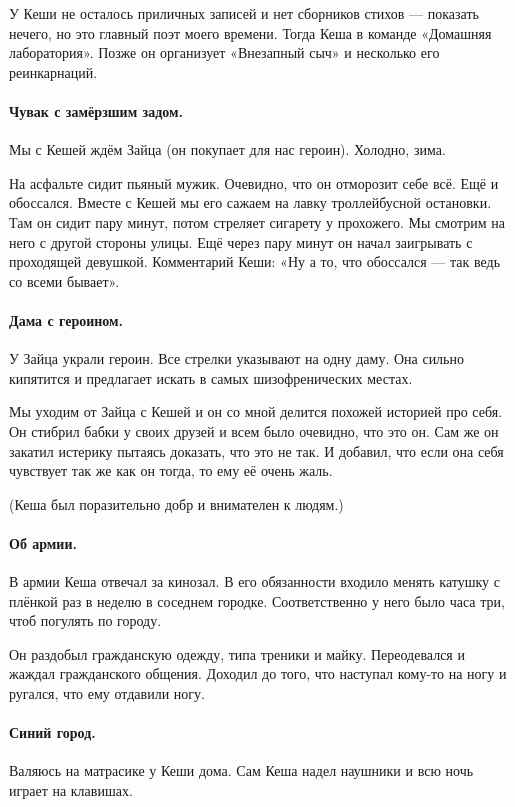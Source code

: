 \documentclass{book}
\begin{document}
У Кеши не осталось приличных записей и нет сборников стихов --- показать нечего, но это главный поэт моего времени.
Тогда Кеша в команде «Домашняя лаборатория».
Позже он организует «Внезапный сыч» и несколько его реинкарнаций.

\paragraph{Чувак с замёрзшим задом.}
Мы с Кешей ждём Зайца (он покупает для нас героин).
Холодно, зима.

На асфальте сидит пьяный мужик.
Очевидно, что он отморозит себе всё.
Ещё и обоссался.
Вместе с Кешей мы его сажаем на лавку троллейбусной остановки.
Там он сидит пару минут, потом стреляет сигарету у прохожего.
Мы смотрим на него с другой стороны улицы.
Ещё через пару минут он начал заигрывать с проходящей девушкой.
Комментарий Кеши: «Ну а то, что обоссался --- так ведь со всеми бывает».

\paragraph{Дама с героином.}
У Зайца украли героин.
Все стрелки указывают на одну даму.
Она сильно кипятится и предлагает искать в самых шизофренических местах.

Мы уходим от Зайца с Кешей и он со мной делится похожей историей про себя.
Он стибрил бабки у своих друзей и всем было очевидно, что это он.
Сам же он закатил истерику пытаясь доказать, что это не так.
И добавил, что если она себя чувствует так же как он тогда, то ему её очень жаль.

(Кеша был поразительно добр и внимателен к людям.)

\paragraph{Об армии.}
В армии Кеша отвечал за кинозал. 
В его обязанности входило менять катушку с плёнкой раз в неделю в соседнем городке.
Соответственно у него было часа три, чтоб погулять по городу.

Он раздобыл гражданскую одежду, типа треники и майку.
Переодевался и жаждал гражданского общения.
Доходил до того, что наступал кому-то на ногу и ругался, что ему отдавили ногу.

\paragraph{Синий город.}
Валяюсь на матрасике у Кеши дома.
Сам Кеша надел наушники и всю ночь играет на клавишах.
\end{document}
